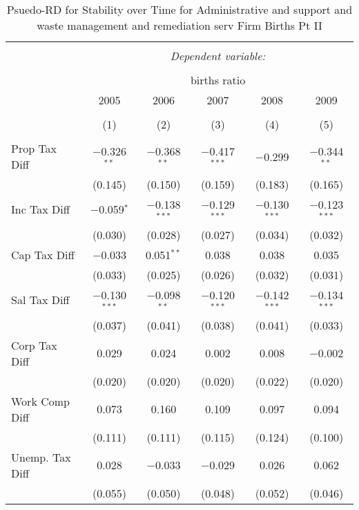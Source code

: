 
\begin{table}[!htbp] \centering 
  \caption{Psuedo-RD for Stability over Time for  Administrative and support and waste management and remediation serv Firm Births Pt II} 
  \label{56year} 
\small 
\begin{tabular}{@{\extracolsep{5pt}}lccccc} 
\\[-1.8ex]\hline 
\hline \\[-1.8ex] 
 & \multicolumn{5}{c}{\textit{Dependent variable:}} \\ 
\cline{2-6} 
\\[-1.8ex] & \multicolumn{5}{c}{births ratio} \\ 
 & 2005 & 2006 & 2007 & 2008 & 2009 \\ 
\\[-1.8ex] & (1) & (2) & (3) & (4) & (5)\\ 
\hline \\[-1.8ex] 
 Prop Tax Diff & $-$0.326$^{**}$ & $-$0.368$^{**}$ & $-$0.417$^{***}$ & $-$0.299 & $-$0.344$^{**}$ \\ 
  & (0.145) & (0.150) & (0.159) & (0.183) & (0.165) \\ 
  Inc Tax Diff & $-$0.059$^{*}$ & $-$0.138$^{***}$ & $-$0.129$^{***}$ & $-$0.130$^{***}$ & $-$0.123$^{***}$ \\ 
  & (0.030) & (0.028) & (0.027) & (0.034) & (0.032) \\ 
  Cap Tax Diff & $-$0.033 & 0.051$^{**}$ & 0.038 & 0.038 & 0.035 \\ 
  & (0.033) & (0.025) & (0.026) & (0.032) & (0.031) \\ 
  Sal Tax Diff & $-$0.130$^{***}$ & $-$0.098$^{**}$ & $-$0.120$^{***}$ & $-$0.142$^{***}$ & $-$0.134$^{***}$ \\ 
  & (0.037) & (0.041) & (0.038) & (0.041) & (0.033) \\ 
  Corp Tax Diff & 0.029 & 0.024 & 0.002 & 0.008 & $-$0.002 \\ 
  & (0.020) & (0.020) & (0.020) & (0.022) & (0.020) \\ 
  Work Comp Diff & 0.073 & 0.160 & 0.109 & 0.097 & 0.094 \\ 
  & (0.111) & (0.111) & (0.115) & (0.124) & (0.100) \\ 
  Unemp. Tax Diff & 0.028 & $-$0.033 & $-$0.029 & 0.026 & 0.062 \\ 
  & (0.055) & (0.050) & (0.048) & (0.052) & (0.046) \\ 

\end{tabular}
\end{table}
